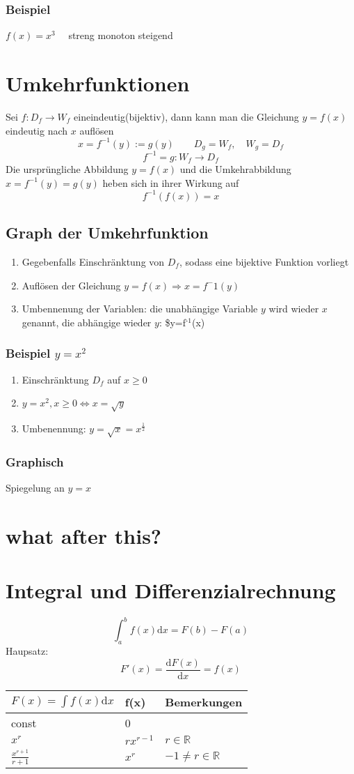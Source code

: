 \documentclass[a4paper]{scrartcl}
\begin{document}
\subsubsection{Beispiel}
\label{sec-8-2-1}
$f(x) = x^3\quad$ streng monoton steigend
\section{Umkehrfunktionen}
\label{sec-9}
Sei $f : D_f\to W_f$ eineindeutig(bijektiv), dann kann man die Gleichung $y=f(x)$ eindeutig nach $x$ auflösen \[x=f^{-1}(y):=g(y)\quad\quad D_g = W_f,\quad W_g = D_f\] \[f^{-1}=g:W_f\to D_f\]
Die ursprüngliche Abbildung $y=f(x)$ und die Umkehrabbildung $x=f^{-1}(y)=g(y)$ heben sich in ihrer Wirkung auf \[f^{-1}(f(x))= x\]
\subsection{Graph der Umkehrfunktion}
\label{sec-9-1}
\begin{enumerate}
\item Gegebenfalls Einschränktung von $D_f$, sodass eine bijektive Funktion vorliegt
\item Auflösen der Gleichung $y=f(x)\Rightarrow x=f^-1(y)$
\item Umbennenung der Variablen: die unabhängige Variable $y$ wird wieder $x$ genannt, die abhängige wieder $y$: \$y=f$^{\text{-1}}$(x)
\end{enumerate}
\subsubsection{Beispiel $y=x^2$}
\label{sec-9-1-1}
\begin{enumerate}
\item Einschränktung $D_f$ auf $x\geq 0$
\item $y=x^2, x\geq 0 \Leftrightarrow x = \sqrt{y}$
\item Umbenennung: $y=\sqrt{x} = x^\frac{1}{2}$
\end{enumerate}
\subsubsection{Graphisch}
\label{sec-9-1-2}
Spiegelung an $y=x$
\section{what after this?}
\label{sec-10}
\section{Integral und Differenzialrechnung}
\label{sec-11}
\[\int_a^b f(x)\mathrm{d}x=F(b) - F(a)\]
Haupsatz:
\[F'(x) = \frac{\mathrm{d}F(x)}{\mathrm{d}x} = f(x)\]
\begin{center}
\begin{tabular}{lll}
$F(x)=\int f(x)\mathrm{d}x$ & f(x) & Bemerkungen\\
\hline
const & 0 & \\
$x^r$ & $r x^{r-1}$ & $r\in\mathbb{R}$\\
$\frac{x^{r+1}}{r+1}$ & $x^r$ & $-1 \neq  r\in\mathbb{R}$\\
\end{tabular}
\end{center}
\end{document}
